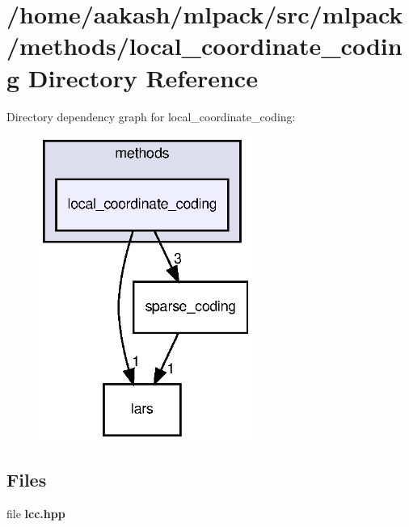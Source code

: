 \section{/home/aakash/mlpack/src/mlpack/methods/local\+\_\+coordinate\+\_\+coding Directory Reference}
\label{dir_c1c3e6335c59af7e410ebd40d35e32f8}
Directory dependency graph for local\+\_\+coordinate\+\_\+coding\+:
\nopagebreak
\begin{figure}[H]
\begin{center}
\leavevmode
\includegraphics[width=198pt]{dir_c1c3e6335c59af7e410ebd40d35e32f8_dep}
\end{center}
\end{figure}
\subsection*{Files}
\begin{DoxyCompactItemize}
\item 
file \textbf{ lcc.\+hpp}
\end{DoxyCompactItemize}
